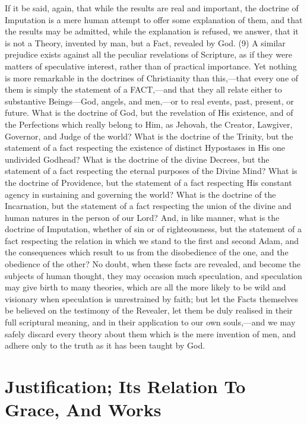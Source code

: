 \documentclass[
]{book}
\begin{document}
If it be said, again, that while the results are real and important, the doctrine of Imputation is a mere human attempt to offer some explanation of them, and that the results may be admitted, while the explanation is refused, we answer, that it is not a Theory, invented by man, but a Fact, revealed by God. (9) A similar prejudice exists against all the peculiar revelations of Scripture, as if they were matters of speculative interest, rather than of practical importance. Yet nothing is more remarkable in the doctrines of Christianity than this,---that every one of them is simply the statement of a FACT,---and that they all relate either to substantive Beings---God, angels, and men,---or to real events, past, present, or future. What is the doctrine of God, but the revelation of His existence, and of the Perfections which really belong to Him, as Jehovah, the Creator, Lawgiver, Governor, and Judge of the world? What is the doctrine of the Trinity, but the statement of a fact respecting the existence of distinct Hypostases in His one undivided Godhead? What is the doctrine of the divine Decrees, but the statement of a fact respecting the eternal purposes of the Divine Mind? What is the doctrine of Providence, but the statement of a fact respecting His constant agency in sustaining and governing the world? What is the doctrine of the Incarnation, but the statement of a fact respecting the union of the divine and human natures in the person of our Lord? And, in like manner, what is the doctrine of Imputation, whether of sin or of righteousness, but the statement of a fact respecting the relation in which we stand to the first and second Adam, and the consequences which result to us from the disobedience of the one, and the obedience of the other? No doubt, when these facts are revealed, and become the subjects of human thought, they may occasion much speculation, and speculation may give birth to many theories, which are all the more likely to be wild and visionary when speculation is unrestrained by faith; but let the Facts themselves be believed on the testimony of the Revealer, let them be duly realised in their full scriptural meaning, and in their application to our own souls,---and we may safely discard every theory about them which is the mere invention of men, and adhere only to the truth as it has been taught by God.

\hypertarget{justification-its-relation-to-grace-and-works}{%
\chapter{Justification; Its Relation To Grace, And Works}\label{justification-its-relation-to-grace-and-works}}
\end{document}
